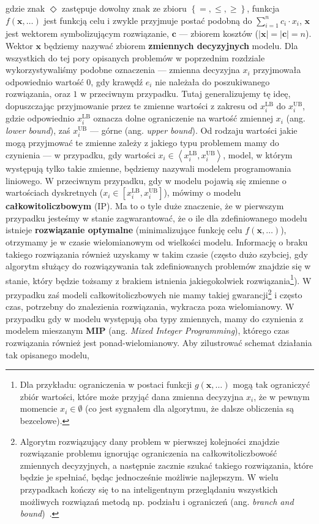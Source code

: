 gdzie znak $\Diamond$ zastępuje dowolny znak ze zbioru $\left\{ =, \leqslant, \geqslant \right\}$, funkcja $f \left( \textbf{x}, \dots \right)$ jest funkcją celu i zwykle przyjmuje postać podobną do $\sum_{i=1}^{n} c_{i} \cdot x_{i}$, $\textbf{x}$ jest wektorem symbolizującym rozwiązanie, $\textbf{c}$ --- zbiorem kosztów ($\left| \textbf{x} \right| = \left| \textbf{c} \right| = n$). Wektor $\textbf{x}$ będziemy nazywać zbiorem \textbf{zmiennych decyzyjnych} modelu. Dla wszystkich do tej pory opisanych problemów w poprzednim rozdziale wykorzystywaliśmy podobne oznaczenia --- zmienna decyzyjna $x_{i}$ przyjmowała odpowiednio wartość $0$, gdy krawędź $e_{i}$ nie należała do poszukiwanego rozwiązania, oraz $1$ w przeciwnym przypadku. Tutaj generalizujemy tę ideę, dopuszczając przyjmowanie przez te zmienne wartości z zakresu od $x_{i}^{\textrm{LB}}$ do $x_{i}^{\textrm{UB}}$, gdzie odpowiednio $x_{i}^{\textrm{LB}}$ oznacza dolne ograniczenie na wartość zmiennej $x_{i}$ (ang. \textit{lower bound}), zaś $x_{i}^{\textrm{UB}}$ --- górne (ang. \textit{upper bound}). Od rodzaju wartości jakie mogą przyjmować te zmienne zależy z jakiego typu problemem mamy do czynienia --- w przypadku, gdy wartości $x_{i} \in \left\langle x_{i}^{\textrm{LB}}, x_{i}^{\textrm{UB}} \right\rangle$, model, w którym występują tylko takie zmienne, będziemy nazywali modelem programowania liniowego. W przeciwnym przypadku, gdy w modelu pojawią się zmienne o wartościach dyskretnych ($x_{i} \in \left[ x_{i}^{\textrm{LB}}, x_{i}^{\textrm{UB}} \right]$), mówimy o modelu \textbf{całkowitoliczbowym} (\textsc{IP}). Ma to o tyle duże znaczenie, że w pierwszym przypadku jesteśmy w stanie zagwarantować, że o ile dla zdefiniowanego modelu istnieje \textbf{rozwiązanie optymalne} (minimalizujące funkcję celu $f \left( \textbf{x}, \dots \right)$), otrzymamy je w czasie wielomianowym od wielkości modelu. Informację o braku takiego rozwiązania również uzyskamy w takim czasie (często dużo szybciej, gdy algorytm służący do rozwiązywania tak zdefiniowanych problemów znajdzie się w stanie, który będzie tożsamy z brakiem istnienia jakiegokolwiek rozwiązania\footnote{Dla przykładu: ograniczenia w postaci funkcji $g \left( \textbf{x}, \dots \right)$ mogą tak ograniczyć zbiór wartości, które może przyjąć dana zmienna decyzyjna $x_{i}$, że w pewnym momencie $x_{i} \in \emptyset$ (co jest sygnałem dla algorytmu, że dalsze obliczenia są bezcelowe).}). W przypadku zaś modeli całkowitoliczbowych nie mamy takiej gwarancji\footnote{Algorytm rozwiązujący dany problem w pierwszej kolejności znajdzie rozwiązanie problemu ignorując ograniczenia na całkowitoliczbowość zmiennych decyzyjnych, a następnie zacznie szukać takiego rozwiązania, które będzie je spełniać, będąc jednocześnie możliwie najlepszym. W wielu przypadkach kończy się to na inteligentnym przeglądaniu wszystkich możliwych rozwiązań metodą np. podziału i ograniczeń (ang. \textit{branch and bound})~\cite[$433$--$448$]{Papadimitriou:1982:COA:31027}.} i często czas, potrzebny do znalezienia rozwiązania, wykracza poza wielomianowy. W przypadku gdy w modelu występują oba typy zmiennych, mamy do czynienia z modelem mieszanym \textbf{MIP} (ang. \textit{Mixed Integer Programming}), którego czas rozwiązania również jest ponad-wielomianowy. Aby zilustrować schemat działania tak opisanego modelu, 